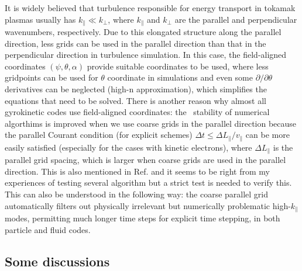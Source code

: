 \documentclass{llncs}
\begin{document}
It is widely believed that turbulence responsible for energy transport in
tokamak plasmas usually has $k_{\parallel} \ll k_{\perp}$, where
$k_{\parallel}$ and $k_{\perp}$ are the parallel and perpendicular
wavenumbers, respectively. Due to this elongated structure along the parallel
direction, less grids can be used in the parallel direction than that in the
perpendicular direction in turbulence simulation. In this case, the
field-aligned coordinates $(\psi, \theta, \alpha)$ provide suitable
coordinates to be used, where less gridpoints can be used for $\theta$
coordinate in simulations and even some $\partial / \partial \theta$
derivatives can be neglected (high-n approximation), which simplifies the
equations that need to be solved. There is another reason why almost all
gyrokinetic codes use field-aligned coordinates: the \ stability of numerical
algorthims is improved when we use coarse grids in the parallel direction
because the parallel Courant condition (for explicit schemes) $\Delta t
\leqslant \Delta L_{\parallel} / v_{\parallel}$ can be more easily satisfied
(especially for the cases with kinetic electrons), where $\Delta
L_{\parallel}$ is the parallel grid spacing, which is larger when coarse grids
are used in the parallel direction. This is also mentioned in Ref.
{\cite{ottaviani2011}} and it seems to be right from my experiences of testing
several algorithm but a strict test is needed to verify this. This can also be
understood in the following way: the coarse parallel grid automatically
filters out physically irrelevant but numerically problematic
high-$k_{\parallel}$ modes, permitting much longer time steps for explicit
time stepping, in both particle and fluid codes{\cite{dimits1993}}.

\subsection{Some discussions}
\end{document}
